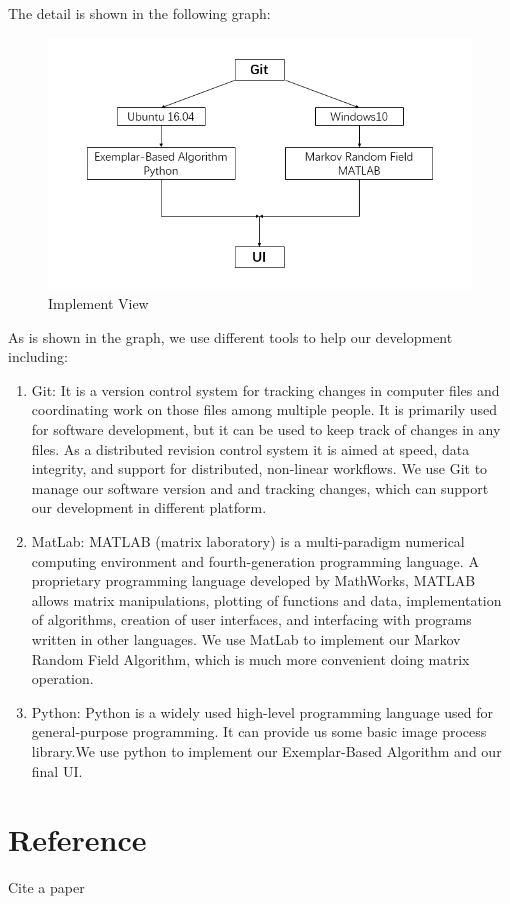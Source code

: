 \documentclass[12pt]{article}
\begin{document}
The detail is shown in the following graph:
\begin{figure}[H]
	\centering
	\includegraphics[width=1.0\linewidth]{implement.jpg}
	\caption{Implement View}
\end{figure}
As is shown in the graph, we use different tools to help our development including:
\begin{enumerate}
	\item Git: It is a version control system for tracking changes in computer files and coordinating work on those files among multiple people. It is primarily used for software development, but it can be used to keep track of changes in any files. As a distributed revision control system it is aimed at speed, data integrity, and support for distributed, non-linear workflows. We use Git to manage our software version and and tracking changes, which can support our development in different platform.
	\item MatLab: MATLAB (matrix laboratory) is a multi-paradigm numerical computing environment and fourth-generation programming language. A proprietary programming language developed by MathWorks, MATLAB allows matrix manipulations, plotting of functions and data, implementation of algorithms, creation of user interfaces, and interfacing with programs written in other languages. We use MatLab to implement our Markov Random Field Algorithm, which is much more convenient doing matrix operation.
	\item Python: Python is a widely used high-level programming language used for general-purpose programming. It can provide us some basic image process library.We use python to implement our Exemplar-Based Algorithm and our final UI.
\end{enumerate}
\section{Reference}


\newpage
Cite a paper\cite{DBLP:conf/siggraph/BertalmioSCB00}


\end{document}
